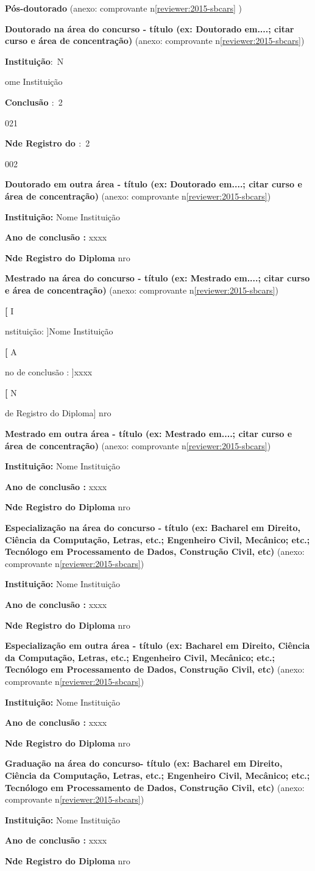 \documentclass[a4paper,oneside,12pt]{article}
\newcommand{\SubItemB}[2]{
    {\setlength\itemindent{15pt} \item[-] \textbf{#1} {#2}}}
\newcommand{\Instituicao}[1]{
    {\setlength\itemindent{15pt} \item[-] {\textbf{Instituição$:$} #1}}}
\newcommand{\Conclusao}[1]{
    {\setlength\itemindent{15pt} \item[-] \textbf{Conclusão $:$} {#1}}}
\newcommand{\RegDiploma}[1]{
    {\setlength\itemindent{15pt} \item[-] \textbf{N\degree de Registro do $:$} {#1}}}
\begin{document}
\begin{enumerate}
\renewcommand{\labelenumi}{{\large\bfseries\arabic{enumi}.}}

    \item \textbf{Pós-doutorado }(anexo: comprovante n\degree \ref{reviewer:2015-sbcars} )
    \item \textbf{ Doutorado na área do concurso - título (ex: Doutorado em....; citar curso e área de concentração)  }(anexo: comprovante  n\degree \ref{reviewer:2015-sbcars})
       \Instituicao Nome Instituição
        \Conclusao 2021
        \RegDiploma 2002
    \item \textbf{Doutorado em outra área - título (ex: Doutorado em....; citar curso e área de concentração)} (anexo: comprovante  n\degree \ref{reviewer:2015-sbcars})
       \SubItemB{Instituição: }{Nome Instituição} 
        \SubItemB{Ano de conclusão : }{xxxx}
        \SubItemB{N\degree de Registro do Diploma}{ nro}
    \item \textbf{Mestrado na área do concurso - título (ex: Mestrado em....; citar curso e área de concentração)} (anexo: comprovante  n\degree \ref{reviewer:2015-sbcars}) 
       \SubItemB[Instituição: ]{Nome Instituição} 
        \SubItemB[Ano de conclusão : ]{xxxx}
        \SubItemB[N\degree de Registro do Diploma]{ nro}
    \item \textbf{Mestrado em outra área - título (ex: Mestrado em....; citar curso e área de concentração) }(anexo: comprovante  n\degree \ref{reviewer:2015-sbcars})
       \SubItemB{Instituição: }{Nome Instituição} 
        \SubItemB{Ano de conclusão : }{xxxx}
        \SubItemB{N\degree de Registro do Diploma}{ nro}
    \item \textbf{Especialização na área do concurso - título (ex: Bacharel em Direito, Ciência da Computação, Letras, etc.; Engenheiro Civil, 
Mecânico; etc.; Tecnólogo em Processamento de Dados, Construção Civil, etc) } (anexo: comprovante  n\degree \ref{reviewer:2015-sbcars})
       \SubItemB{Instituição: }{Nome Instituição} 
        \SubItemB{Ano de conclusão : }{xxxx}
        \SubItemB{N\degree de Registro do Diploma}{ nro} 
    \item \textbf{Especialização em outra área - título (ex: Bacharel em Direito, Ciência da Computação, Letras, etc.; Engenheiro Civil, 
Mecânico; etc.; Tecnólogo em Processamento de Dados, Construção Civil, etc) }(anexo: comprovante  n\degree \ref{reviewer:2015-sbcars})
        \SubItemB{Instituição: }{Nome Instituição} 
        \SubItemB{Ano de conclusão : }{xxxx}
        \SubItemB{N\degree de Registro do Diploma}{ nro}
    \item \textbf{Graduação na área do concurso- título (ex: Bacharel em Direito, Ciência da Computação, Letras, etc.; Engenheiro Civil, 
Mecânico; etc.; Tecnólogo em Processamento de Dados, Construção Civil, etc) } (anexo: comprovante  n\degree \ref{reviewer:2015-sbcars})
        \SubItemB{Instituição: }{Nome Instituição} 
        \SubItemB{Ano de conclusão : }{xxxx}
        \SubItemB{N\degree de Registro do Diploma}{ nro}
\end{enumerate}
\end{document}
